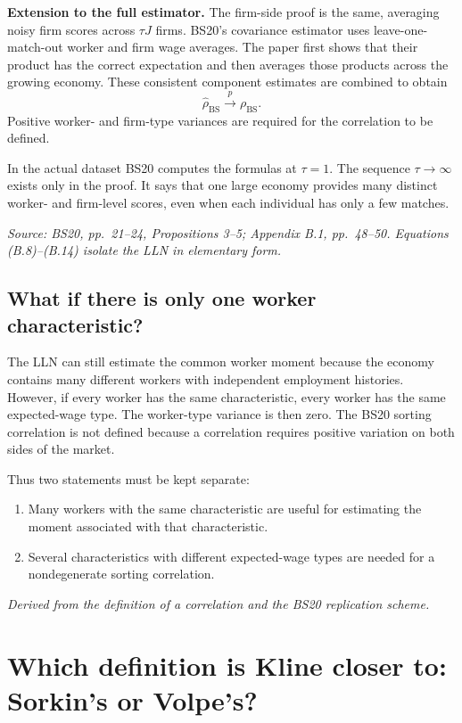 \documentclass[11pt]{article}
\begin{document}
\textbf{Extension to the full estimator.}
The firm-side proof is the same, averaging noisy firm scores across
\(\tau J\) firms.  BS20's covariance estimator uses leave-one-match-out
worker and firm wage averages.  The paper first shows that their product has
the correct expectation and then averages those products across the growing
economy.  These consistent component estimates are combined to obtain
\[
\widehat\rho_{\mathrm{BS}}
\overset p\longrightarrow
\rho_{\mathrm{BS}}.
\tag{B.15}
\]
Positive worker- and firm-type variances are required for the correlation to
be defined.

In the actual dataset BS20 computes the formulas at \(\tau=1\).
The sequence \(\tau\to\infty\) exists only in the proof.  It says that one
large economy provides many distinct worker- and firm-level scores, even
when each individual has only a few matches.

\textit{Source: BS20, pp.\ 21--24, Propositions 3--5; Appendix B.1,
pp.\ 48--50.  Equations (B.8)--(B.14) isolate the LLN in elementary form.}

\subsection{What if there is only one worker characteristic?}

The LLN can still estimate the common worker moment because the economy
contains many different workers with independent employment histories.
However, if every worker has the same characteristic, every worker has the
same expected-wage type.  The worker-type variance is then zero.  The BS20
sorting correlation is not defined because a correlation requires positive
variation on both sides of the market.

Thus two statements must be kept separate:

\begin{enumerate}
\item Many workers with the same characteristic are useful for estimating
the moment associated with that characteristic.
\item Several characteristics with different expected-wage types are needed
for a nondegenerate sorting correlation.
\end{enumerate}

\textit{Derived from the definition of a correlation and the BS20
replication scheme.}

\section{Which definition is Kline closer to: Sorkin's or Volpe's?}
\end{document}
